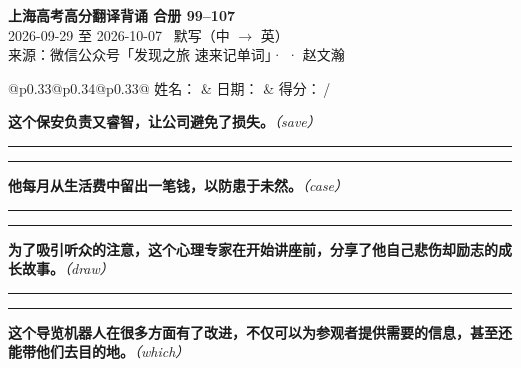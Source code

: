 \documentclass[11pt,a4paper]{article}
\newcommand{\num}[1]{\makebox[1.9em][r]{#1.}\hspace{0.3em}}
\newcommand{\wline}{\noindent\rule{\linewidth}{0.4pt}}
\newcommand{\prompt}[1]{\emph{\textcolor{tipblue}{\small（#1）}}}
\begin{document}
\pagestyle{plain}
\begin{center}
{\LARGE\bfseries 上海高考高分翻译背诵 \quad 合册 99–107}\\[0.25em]
{\large 2026-09-29 至 2026-10-07 \quad\ 默写（中 $\to$ 英）}\\[0.35em]
{\footnotesize 来源：微信公众号「发现之旅 速来记单词」·  · 赵文瀚}
\end{center}

\vspace{0.4em}
\noindent\begin{tabular}{@{}p{0.33\textwidth}@{}p{0.34\textwidth}@{}p{0.33\textwidth}@{}}
姓名：\underline{\hspace{2.0cm}} & 日期：\underline{\hspace{2.0cm}} & 得分：\underline{\hspace{1.4cm}}\,/ \\
\end{tabular}

\vspace{0.5em}

\vspace{0.8em}
\vspace{0.35em}\vspace{0.15em}

\num{1}\textbf{这个保安负责又睿智，让公司避免了损失。}\prompt{save}

\vspace{0.3em}

\wline\vspace{0.3em}
\wline

\num{2}\textbf{他每月从生活费中留出一笔钱，以防患于未然。}\prompt{case}

\vspace{0.3em}

\wline\vspace{0.3em}
\wline

\num{3}\textbf{为了吸引听众的注意，这个心理专家在开始讲座前，分享了他自己悲伤却励志的成长故事。}\prompt{draw}

\vspace{0.3em}

\wline\vspace{0.3em}
\wline

\num{4}\textbf{这个导览机器人在很多方面有了改进，不仅可以为参观者提供需要的信息，甚至还能带他们去目的地。}\prompt{which}
\end{document}
